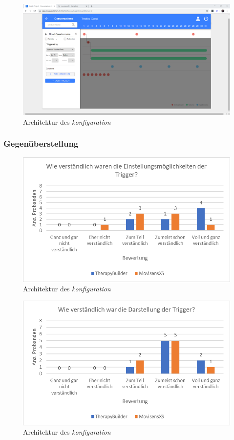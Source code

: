\begin{figure}[!h]
\centering
\includegraphics[width=1\textwidth]{pictures/konfiguration}
\caption{Architektur des \emph{konfiguration}}
\label{konfiguration}
\end{figure}


\subsubsection{Gegenüberstellung}

\begin{figure}[!h]
\centering
\includegraphics[width=1\textwidth]{pictures/diagramme/triggereinstellung}
\caption{Architektur des \emph{konfiguration}}
\label{triggereinstellung}
\end{figure}

\begin{figure}[!h]
\centering
\includegraphics[width=1\textwidth]{pictures/diagramme/triggerdarstellung}
\caption{Architektur des \emph{konfiguration}}
\label{triggerdarstellung}
\end{figure}

